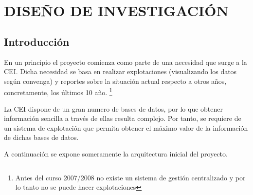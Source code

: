 \section{DISEÑO DE INVESTIGACIÓN}

\subsection{Introducción}
En un principio el proyecto comienza como parte de una necesidad que surge a la CEI. Dicha necesidad se basa en realizar explotaciones (visualizando los datos según convenga) y reportes sobre la situación actual respecto a otros años, concretamente, los últimos 10 año. \footnote{Antes del curso 2007/2008 no existe un sistema de gestión centralizado y por lo tanto no se puede hacer explotaciones}

La CEI dispone de un gran numero de bases de datos, por lo que obtener información sencilla a través de ellas resulta complejo. Por tanto, se requiere de un sistema de explotación que permita obtener el máximo valor de la información de dichas bases de datos.


A continuación se expone someramente la arquitectura inicial del proyecto.




